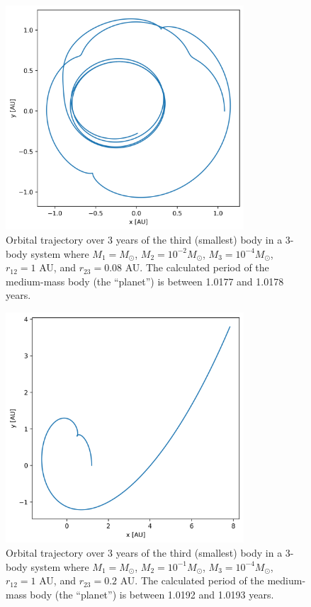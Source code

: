 \documentclass{article}
\begin{document}
\begin{figure}[H]
    \centering
    \includegraphics[width=3.5in]{homework4/1-3.png}
    \caption{Orbital trajectory over 3 years of the third (smallest) body in a 3-body system where $M_1=M_\odot$, $M_2=10^{-2}M_\odot$, $M_3 = 10^{-4}M_\odot$, $r_{12}=1$ AU, and $r_{23}= 0.08$ AU. The calculated period of the medium-mass body (the ``planet'') is between 1.0177 and 1.0178 years.}
    \label{fig:1-3}
\end{figure}

\begin{figure}[H]
    \centering
    \includegraphics[width=3.5in]{homework4/1-4.png}
    \caption{Orbital trajectory over 3 years of the third (smallest) body in a 3-body system where $M_1=M_\odot$, $M_2=10^{-1}M_\odot$, $M_3 = 10^{-4}M_\odot$, $r_{12}=1$ AU, and $r_{23}= 0.2$ AU. The calculated period of the medium-mass body (the ``planet'') is between 1.0192 and 1.0193 years.}
    \label{fig:1-4}
\end{figure}
\end{document}
